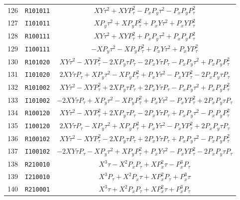 {{\begin{center}
\begin{tabular}{ccc}
  126&{\tt R101011}&$XY{\tau}^{2}+XYP_{\tau}^{2}-P_xP_y{\tau}^{2}-P_xP_yP_{\tau}^{2}$\\
  127&{\tt I101011}&$XP_y{\tau}^{2}+XP_yP_{\tau}^{2}+P_xY{\tau}^{2}+P_xYP_{\tau}^{2}$\\
  128&{\tt R100111}&$XY{\tau}^{2}+XYP_{\tau}^{2}+P_xP_y{\tau}^{2}+P_xP_yP_{\tau}^{2}$\\
  129&{\tt I100111}&$-XP_y{\tau}^{2}-XP_yP_{\tau}^{2}+P_xY{\tau}^{2}+P_xYP_{\tau}^{2}$\\  130&{\tt R101020}&$XY{\tau}^{2}-XYP_{\tau}^{2}-2XP_y{\tau}P_{\tau}-2P_xY{\tau}P_{\tau}-P_xP_y{\tau}^{2}+P_xP_yP_{\tau}^{2}$\\  131&{\tt I101020}&$2XY{\tau}P_{\tau}+XP_y{\tau}^{2}-XP_yP_{\tau}^{2}+P_xY{\tau}^{2}-P_xYP_{\tau}^{2}-2P_xP_y{\tau}P_{\tau}$\\  132&{\tt R101002}&$XY{\tau}^{2}-XYP_{\tau}^{2}+2XP_y{\tau}P_{\tau}+2P_xY{\tau}P_{\tau}-P_xP_y{\tau}^{2}+P_xP_yP_{\tau}^{2}$\\
133&{\tt I101002}&$-2XY{\tau}P_{\tau}+XP_y{\tau}^{2}-XP_yP_{\tau}^{2}+P_xY{\tau}^{2}-P_xYP_{\tau}^{2}+2P_xP_y{\tau}P_{\tau}$\\  134&{\tt R100120}&$XY{\tau}^{2}-XYP_{\tau}^{2}+2XP_y{\tau}P_{\tau}-2P_xY{\tau}P_{\tau}+P_xP_y{\tau}^{2}-P_xP_yP_{\tau}^{2}$\\  135&{\tt I100120}&$2XY{\tau}P_{\tau}-XP_y{\tau}^{2}+XP_yP_{\tau}^{2}+P_xY{\tau}^{2}-P_xYP_{\tau}^{2}+2P_xP_y{\tau}P_{\tau}$\\  136&{\tt R100102}&$XY{\tau}^{2}-XYP_{\tau}^{2}-2XP_y{\tau}P_{\tau}+2P_xY{\tau}P_{\tau}+P_xP_y{\tau}^{2}-P_xP_yP_{\tau}^{2}$\\  137&{\tt I100102}&$-2XY{\tau}P_{\tau}-XP_y{\tau}^{2}+XP_yP_{\tau}^{2}+P_xY{\tau}^{2}-P_xYP_{\tau}^{2}-2P_xP_y{\tau}P_{\tau}$\\
  138&{\tt R210010}&$X^{3}{\tau}-X^{2}P_xP_{\tau}+XP_x^{2}{\tau}-P_x^{3}P_{\tau}$\\
  139&{\tt I210010}&$X^{3}P_{\tau}+X^{2}P_x{\tau}+XP_x^{2}P_{\tau}+P_x^{3}{\tau}$\\
  140&{\tt R210001}&$X^{3}{\tau}+X^{2}P_xP_{\tau}+XP_x^{2}{\tau}+P_x^{3}P_{\tau}$
\end{tabular}



\end{center}}}
